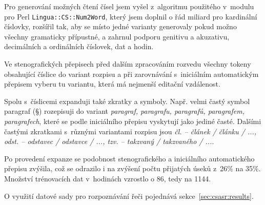 Pro generování možných čtení čísel jsem vyšel z~algoritmu použitého v~modulu pro
Perl \texttt{Lingua::CS::Num2Word}, který jsem doplnil o řád miliard pro
kardinální číslovky, rozšířil tak, aby se místo jedné varianty generovaly
pokud možno všechny gramaticky přípustné, a zahrnul podporu genitivu a
akuzativu, decimálních a ordinálních číslovek, dat a hodin.

Ve stenografických přepisech před dalším zpracováním rozvedu všechny tokeny
obsahující číslice do variant rozpisu a při zarovnávání s~iniciálním
automatickým přepisem vyberu tu variantu, která má nejmenší editační vzdálenost.

Spolu s~číslicemi expanduji také zkratky a symboly. Např. velmi častý symbol
paragraf (§) rozepisuji do variant {\em paragraf, paragrafu, paragrafů,
paragrafem, paragrafech}, které se podle iniciálního přepisu vyskytují jako
jediné časté. Dalšími častými zkratkami s~různými variantami rozpisu jsou {\em
čl. -- článek / článku / ..., odst. -- odstavec / odstavce / ..., tzv. --
takzvaný / takzvaného / ...}.

Po provedení expanze se podobnost stenografického a iniciálního automatického
přepisu zvýšila, což se odrazilo i na zvýšení počtu přijatých úseků z~26\% na
35\%. Množství trénovacích dat v~hodinách vzrostlo o 86, tedy na 1144.

O využití datové sady pro rozpoznávání řeči pojednává sekce~\ref{sec:csasr:results}.
